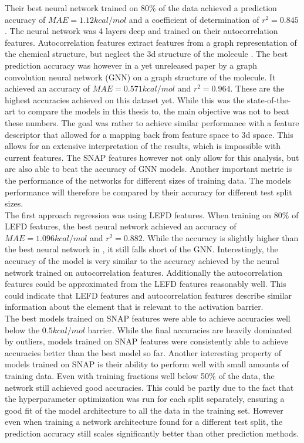 Their best neural network trained on 80\% of the data achieved a prediction accuracy of $MAE = 1.12 kcal/mol$ and a 
coefficient of determination of $r^2 = 0.845$.
The neural network was 4 layers deep and trained on their autocorrelation features.
Autocorrelation features extract features from a graph representation of the chemical structure, but neglect the 
3d structure of the molecule \cite{friederich_dos}.
The best prediction accuracy was however in a yet unreleased paper by  a graph convolution neural network (GNN) on 
a graph structure of the molecule.
It achieved an accuracy of $MAE = 0.571 kcal/mol$ and $r^2=0.964$.
These are the highest accuracies achieved on this dataset yet.
While this was the state-of-the-art  to compare the models in this thesis to, the main objective was not to beat these numbers.
The goal was rather to achieve similar performance with a feature descriptor that allowed for a mapping back from feature space to 3d space.
This allows for an extensive interpretation of the results, which is impossible with current features.
The SNAP features however not only allow for this analysis, but are also able to beat the accuracy of GNN models.
Another important metric is the performance of the networks for different sizes of training data.
The models performance will therefore be compared by their accuracy for different test split sizes.
\\
The first approach regression was using LEFD features.
When training on 80\% of LEFD features, the best neural network achieved an accuracy of $MAE = 1.096 kcal/mol$ and $r^2=0.882$.
While the accuracy is slightly higher than the best neural network in \cite{friederich_dos}, it still falls short 
of the GNN.
Interestingly, the accuracy of the model is very similar to the accuracy achieved by the neural network trained on autocorrelation 
features.
Additionally the autocorrelation features could be approximated from the LEFD features reasonably well.
This could indicate that LEFD features and autocorrelation features describe
similar information about the element that is relevant to the activation barrier.
\\
The best models trained on SNAP features were able to achieve accuracies well below the $0.5 kcal/mol$ barrier.
While the final accuracies are heavily dominated by outliers, models trained on SNAP features were consistently
able to achieve accuracies better than the best model so far.
Another interesting property of models trained on SNAP is their ability to perform well with small amounts 
of training data.
Even with training fractions well below 50\% of the data, the network still achieved good accuracies.
This could be partly due to the fact that the hyperparameter optimization was run for each split separately,
ensuring a good fit of the model architecture to all the data in the training set.
However even when training a network architecture found for a different test split, the 
prediction accuracy still scales significantly better than other prediction methods.

